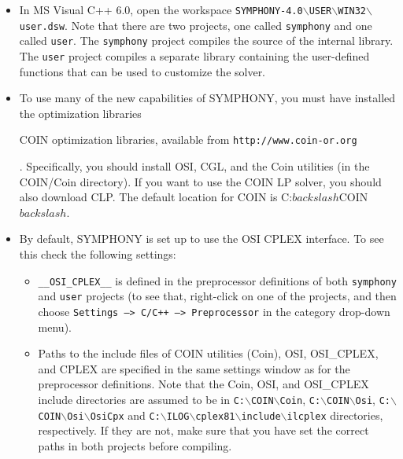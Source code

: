 \begin{itemize}

\item In MS Visual C++ 6.0, open the workspace
\texttt{SYMPHONY-4.0$\backslash$USER$\backslash$WIN32$\backslash$user.dsw}. 
Note that there are two projects, one called \texttt{symphony} and one called
\texttt{user}.  The \texttt{symphony} project compiles the source of the internal
library. The \texttt{user} project compiles a separate library containing the
user-defined functions that can be used to customize the solver.

\item To use many of the new capabilities of SYMPHONY, you must have installed
the \emph{} optimization
libraries 
\begin{latexonly} 
COIN optimization libraries, available from
\texttt{http://www.coin-or.org} 
\end{latexonly}. Specifically, you should
install OSI, CGL, and the Coin utilities (in the COIN/Coin directory). If you
want to use the COIN LP solver, you should also download CLP. The default
location for COIN is C:$backslash$COIN$backslash$.

\item By default, SYMPHONY is set up to use the OSI CPLEX interface. To see this
check the following settings:

\begin{itemize}

\item \texttt{\_\_OSI\_CPLEX\_\_} is defined in the preprocessor definitions
of both \texttt{symphony} and \texttt{user} projects (to see that, right-click
on one of the projects, and then choose \texttt{Settings --> C/C++ -->
Preprocessor} in the category drop-down menu).

\item Paths to the include files of COIN utilities (Coin), OSI, OSI\_CPLEX, and
CPLEX are specified in the same settings window as for the preprocessor
definitions. Note that the Coin, OSI, and OSI\_CPLEX include directories are
assumed to be in \texttt{C:$\backslash$COIN$\backslash$Coin},
\texttt{C:$\backslash$COIN$\backslash$Osi},
\texttt{C:$\backslash$COIN$\backslash$Osi$\backslash$OsiCpx} and 
\texttt{C:$\backslash$ILOG$\backslash$cplex81$\backslash$include$\backslash$ilcplex}
directories, respectively. If they are not, make sure that you have set the
correct paths in both projects before compiling.


\end{itemize}
\end{itemize}
